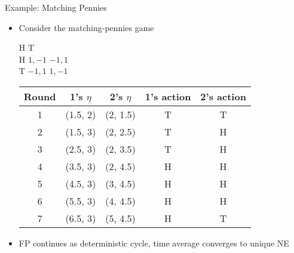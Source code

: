 \documentclass[11pt,aspectratio=169,handout]{beamer}
\begin{document}
  
  \begin{frame}{Example: Matching Pennies}
   \begin{itemize}[<+->]
    \item Consider the matching-pennies game
    \begin{center}\scriptsize
     \hspace{-3.5em}
     \begin{game}{2}{2}
      	\> H			\> T		\\
      H	\> $1,-1$	\> $-1,1$	\\
      T	\> $-1,1$	\> $1,-1$
     \end{game}
    \end{center}
    \vspace{0.75em}
    \begin{center}
     \begin{tabular}{ccccc}
      Round	& 1's $\eta$	& 2's $\eta$	& 1's action	& 2's action			\\ \hline
      1		& (1.5, 2)	& (2, 1.5) 	& T			& T			\pause	\\
      2		& (1.5, 3)	& (2, 2.5) 	& T			& H			\pause	\\
      3		& (2.5, 3)	& (2, 3.5) 	& T			& H			\pause	\\
      4		& (3.5, 3)	& (2, 4.5) 	& H			& H			\pause	\\
      5		& (4.5, 3)	& (3, 4.5) 	& H			& H			\pause	\\
      6		& (5.5, 3)	& (4, 4.5) 	& H			& H			\pause	\\
      7		& (6.5, 3)	& (5, 4.5) 	& H			& T			\pause	\\
     \end{tabular}
    \end{center}
    \vspace{0.75em}
    \item FP continues as deterministic cycle, time average converges to unique NE
   \end{itemize}
  \end{frame}
  
\end{document}
